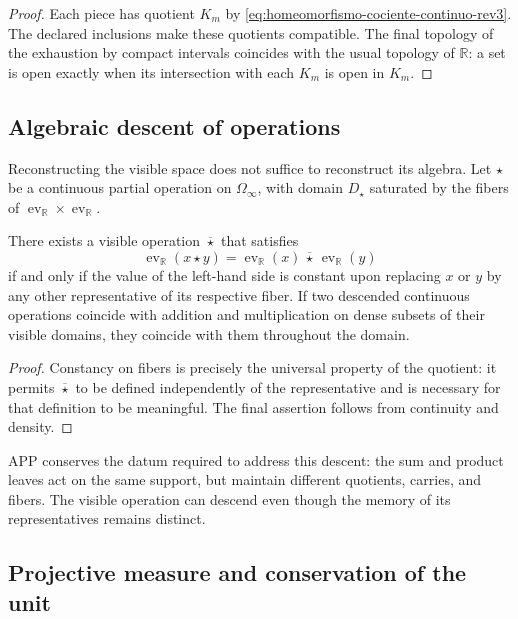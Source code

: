 \begin{proof}
Each piece has quotient \(K_m\) by
\eqref{eq:homeomorfismo-cociente-continuo-rev3}. The declared inclusions
make these quotients compatible. The final topology of the exhaustion by
compact intervals coincides with the usual topology of \(\mathbb R\): a
set is open exactly when its intersection with each \(K_m\) is
open in \(K_m\).
\end{proof}

\subsection{Algebraic descent of operations}

Reconstructing the visible space does not suffice to reconstruct its algebra. Let
\(\star\) be a continuous partial operation on \(\Omega_\infty\), with domain
\(D_\star\) saturated by the fibers of
\(\operatorname{ev}_{\mathbb R}\times\operatorname{ev}_{\mathbb R}\).

\begin{theorem}
\label{thm:descenso-operaciones-continuo-rev3}
There exists a visible operation \(\overline\star\) that satisfies
\[
 \operatorname{ev}_{\mathbb R}(x\star y)
 =\operatorname{ev}_{\mathbb R}(x)\,\overline\star\,
  \operatorname{ev}_{\mathbb R}(y)
\]
if and only if the value of the left-hand side is constant upon replacing
\(x\) or \(y\) by any other representative of its respective fiber.
If two descended continuous operations coincide with addition and multiplication
on dense subsets of their visible domains, they coincide with them throughout
the domain.
\end{theorem}

\begin{proof}
Constancy on fibers is precisely the universal property of the quotient: it
permits \(\overline\star\) to be defined independently of the representative and
is necessary for that definition to be meaningful. The final assertion
follows from continuity and density.
\end{proof}

APP conserves the datum required to address this descent: the sum and
product leaves act on the same support, but maintain different quotients, carries, and
fibers. The visible operation can descend even though the memory of
its representatives remains distinct.

\subsection{Projective measure and conservation of the unit}

